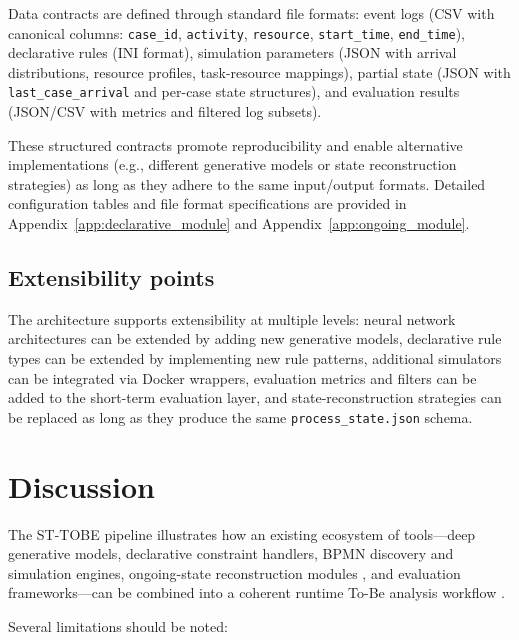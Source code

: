 \documentclass[a4paper,fleqn]{cas-sc}
\begin{document}
Data contracts are defined through standard file formats:
event logs (CSV with canonical columns: \verb|case_id|, \verb|activity|,
\verb|resource|, \verb|start_time|, \verb|end_time|), declarative rules
(INI format), simulation parameters (JSON with arrival distributions,
resource profiles, task-resource mappings), partial state (JSON with
\verb|last_case_arrival| and per-case state structures), and evaluation
results (JSON/CSV with metrics and filtered log subsets).

These structured contracts promote reproducibility and enable
alternative implementations (e.g., different generative models or
state reconstruction strategies) as long as they adhere to the
same input/output formats.
Detailed configuration tables and file format specifications are
provided in Appendix~\ref{app:declarative_module} and
Appendix~\ref{app:ongoing_module}.

\subsection{Extensibility points}

The architecture supports extensibility at multiple levels:
neural network architectures can be extended by adding new generative
models, declarative rule types can be extended by implementing new
rule patterns, additional simulators can be integrated via Docker
wrappers, evaluation metrics and filters can be added to the
short-term evaluation layer, and state-reconstruction strategies
can be replaced as long as they produce the same \verb|process_state.json|
schema.

\section{Discussion}
\label{sec:discussion}

The ST-TOBE pipeline illustrates how an existing ecosystem of
tools---deep generative models, declarative constraint
handlers, BPMN discovery and simulation engines, ongoing-state
reconstruction modules \citep{ChapelaCampa2025TSC}, and evaluation frameworks---can be
combined into a coherent runtime To-Be analysis workflow
\citep{Meneghello2025IS,Avramenko2025arXiv}.

Several limitations should be noted:
\end{document}
